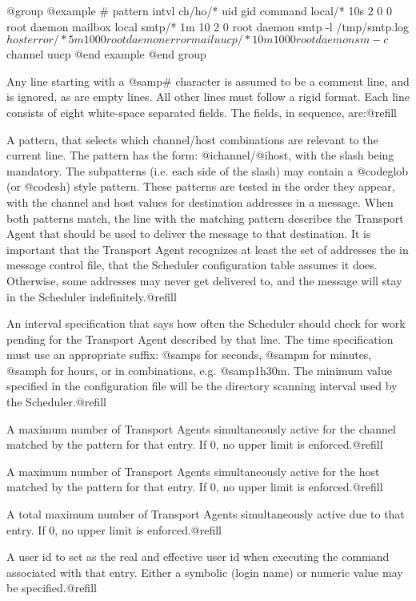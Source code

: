 {{@group
@example
# pattern    intvl   ch/ho/* uid     gid     command
local/*      10s      2 0 0  root    daemon  mailbox local
smtp/*       1m      10 2 0  root    daemon  smtp -l /tmp/smtp.log $host
error/*      5m      10 0 0  root    daemon  errormail
uucp/*       10m     10 0 0  root    daemon  sm -c $channel uucp
@end example
@end group

Any line starting with a @samp{#} character is assumed to be a comment
line, and is ignored, as are empty lines.  All other lines must follow a
rigid format.  Each line consists of eight white-space separated fields.
The fields, in sequence, are:@refill

A pattern, that selects which channel/host combinations are relevant to the
current line.  The pattern has the form: @i{channel}/@i{host}, with the slash
being mandatory.  The subpatterns (i.e. each side of the slash) may contain a
@code{glob} (or @code{sh}) style pattern.  These patterns are tested in the
order they appear, with the channel and host values for destination addresses
in a message.  When both patterns match, the line with the matching pattern
describes the Transport Agent that should be used to deliver the message to
that destination.  It is important that the Transport Agent recognizes at
least the set of addresses the in message control file, that the Scheduler
configuration table assumes it does.  Otherwise, some addresses may never
get delivered to, and the message will stay in the Scheduler
indefinitely.@refill

An interval specification that says how often the Scheduler should check for
work pending for the Transport Agent described by that line.  The time
specification must use an appropriate suffix: @samp{s} for seconds, @samp{m}
for minutes, @samp{h} for hours, or in combinations, e.g. @samp{1h30m}.
The minimum value specified in the configuration file will be the directory
scanning interval used by the Scheduler.@refill

A maximum number of Transport Agents simultaneously active for the channel
matched by the pattern for that entry.  If 0, no upper limit is enforced.@refill

A maximum number of Transport Agents simultaneously active for the host
matched by the pattern for that entry.  If 0, no upper limit is enforced.@refill

A total maximum number of Transport Agents simultaneously active due to that
entry.  If 0, no upper limit is enforced.@refill

A user id to set as the real and effective user id when executing the command
associated with that entry.  Either a symbolic (login name) or numeric value
may be specified.@refill

}}
